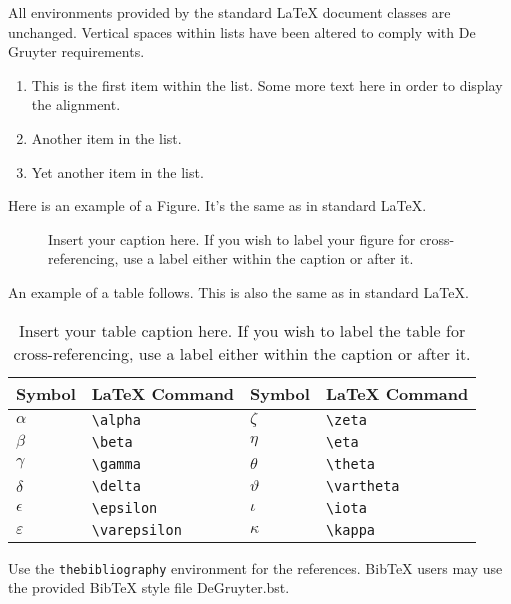\documentclass[letterpaper,12pt]{article}
\begin{document}
All environments provided by the standard LaTeX document classes are
unchanged. Vertical spaces within lists have been altered to comply with De Gruyter
requirements.
\begin{enumerate}
\item This is the first item within the list. Some more text here in order to display the alignment.
\item Another item in the list.
\item Yet another item in the list.
\end{enumerate}

Here is an example of a Figure. It's the same as in standard LaTeX.

\begin{figure}[!h]
\centering
\caption{Insert your caption here. If you wish to label your figure for
  cross-referencing, use a label either within the caption or after it.}
\label{fig1}
\end{figure}

An example of a table follows. This is also the same as in standard LaTeX.

\begin{table}[!h]
\centering
\caption{Insert your table caption here. If you wish to label the table for
  cross-referencing, use a label either within the caption or after it.}
\begin{tabular}{llll}
\hline
Symbol        & LaTeX Command      & Symbol      & LaTeX Command \\
\hline
$\alpha$      & \verb+\alpha+      & $\zeta$     & \verb+\zeta+ \\
$\beta$       & \verb+\beta+       & $\eta$      & \verb+\eta+ \\
$\gamma$      & \verb+\gamma+      & $\theta$    & \verb+\theta+ \\
$\delta$      & \verb+\delta+      & $\vartheta$ & \verb+\vartheta+ \\
$\epsilon$    & \verb+\epsilon+    & $\iota$     & \verb+\iota+ \\
$\varepsilon$ & \verb+\varepsilon+ & $\kappa$    & \verb+\kappa+ \\
\hline
\end{tabular}
\end{table}

Use the \verb+thebibliography+ environment for the references.  BibTeX users may
use the provided BibTeX style file DeGruyter.bst.



\end{document}
